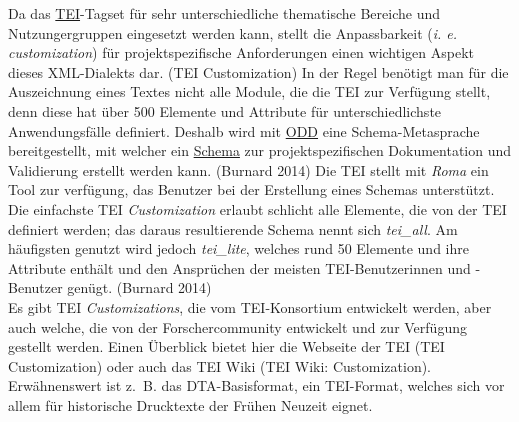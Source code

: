 \documentclass{article}
\begin{document}
    Da das \href{http://gams.uni-graz.at/o:konde.178}{TEI}-Tagset für sehr unterschiedliche thematische Bereiche und Nutzungergruppen eingesetzt werden kann, stellt die Anpassbarkeit (\emph{i. e. customization}) für projektspezifische Anforderungen einen wichtigen Aspekt dieses XML-Dialekts dar. (TEI Customization) In der Regel benötigt man für die Auszeichnung eines Textes nicht alle Module, die die TEI zur Verfügung stellt, denn diese hat über 500 Elemente und Attribute für unterschiedlichste Anwendungsfälle definiert. Deshalb wird mit \href{http://gams.uni-graz.at/o:konde.150}{ODD} eine Schema-Metasprache bereitgestellt, mit welcher ein \href{http://gams.uni-graz.at/o:konde.166}{Schema} zur projektspezifischen Dokumentation und Validierung erstellt werden kann. (Burnard 2014) Die TEI stellt mit \emph{Roma} ein Tool zur verfügung, das Benutzer bei der Erstellung eines Schemas unterstützt.\\
            
        Die einfachste TEI \emph{Customization} erlaubt schlicht alle Elemente, die von der TEI definiert werden; das daraus resultierende Schema nennt sich \emph{tei\_all}. Am häufigsten genutzt wird jedoch \emph{tei\_lite}, welches rund 50 Elemente und ihre Attribute enthält und den Ansprüchen der meisten TEI-Benutzerinnen und -Benutzer genügt. (Burnard 2014)\\
            
        Es gibt TEI \emph{Customizations}, die vom TEI-Konsortium entwickelt werden, aber auch welche, die von der Forschercommunity entwickelt und zur Verfügung gestellt werden. Einen Überblick bietet hier die Webseite der TEI (TEI Customization) oder auch das TEI Wiki (TEI Wiki: Customization). Erwähnenswert ist z. B. das DTA-Basisformat, ein TEI-Format, welches sich vor allem für historische Drucktexte der Frühen Neuzeit eignet. \\
            
\end{document}
